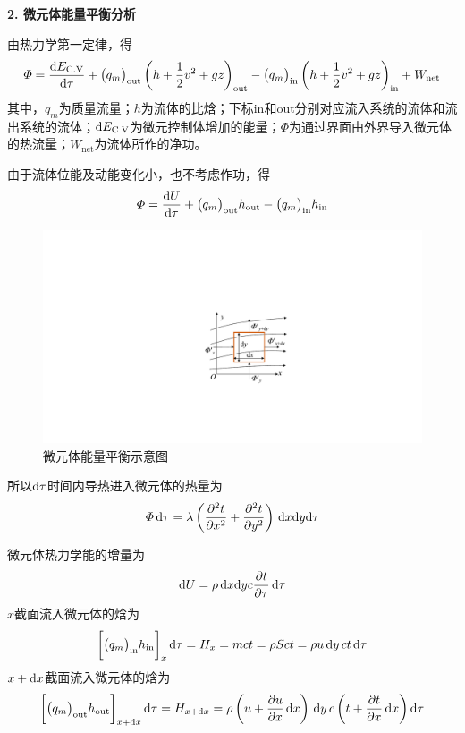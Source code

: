 \noindent \textbf{2. 微元体能量平衡分析}

由热力学第一定律，得
\begin{equation}
	\varPhi = \dfrac{{\rm{d}} E_{\text{C.V}}}{{\rm{d}} \tau} + \big(q_m\big)_{\text{out}} \left(h + \dfrac{1}{2}v^2 + gz\right)_{\text{out}} - \big(q_m\big)_{\text{in}} \left(h + \dfrac{1}{2} v^2 + gz\right)_{\text{in}} + W_{\text{net}}
\end{equation}
其中，$q_m$为质量流量；$h$为流体的比焓；下标in和out分别对应流入系统的流体和流出系统的流体；${\rm{d}} E_{\text{C.V}}$为微元控制体增加的能量；$\varPhi$为通过界面由外界导入微元体的热流量；$W_{\text{net}}$为流体所作的净功。

由于流体位能及动能变化小，也不考虑作功，得
\begin{equation}
	\varPhi = \dfrac{{\rm{d}} U}{{\rm{d}} \tau} + \big(q_m\big)_{\text{out}}h_{\text{out}}-\big(q_m\big)_{\text{in}}h_{\text{in}}
\end{equation}
\begin{figure}[!htb]
	\centering
	\vspace*{-2em}
	\includegraphics[width=0.25\linewidth]{pic/微元体能量平衡.pdf}
	\vspace*{-1em}
	\caption{微元体能量平衡示意图}
	\label{微元体能量平衡}
\end{figure}

所以${\rm{d}} \tau$时间内导热进入微元体的热量为
\begin{equation}
	\varPhi \, {\rm{d}} \tau = \lambda \left(\dfrac{\partial^2 t}{\partial x^2} + \dfrac{\partial^2 t}{\partial y^2}\right) \, {\rm{d}} x {\rm{d}} y {\rm{d}} \tau
\end{equation}

微元体热力学能的增量为
\begin{equation}
	{\rm{d}} U = \rho \, {\rm{d}} x {\rm{d}} y c \dfrac{\partial t}{\partial \tau}\, {\rm{d}} \tau
	\label{能量守恒分析}
\end{equation}
$x$截面流入微元体的焓为
\begin{equation}
	\bigg[\big(q_m\big)_{\text{in}}h_{\text{in}}\bigg]_x \, {\rm{d}} \tau = H_x = mct = \rho S c t = \rho u \, {\rm{d}} y \, ct \, {\rm{d}} \tau
\end{equation}
$x + {\rm{d}} x$截面流入微元体的焓为
\begin{equation}
	\bigg[\big( q_m \big)_{\text{out}} h_{\text{out}}\bigg]_{x+{\rm{d}} x} \, {\rm{d}} \tau = H_{x +{\rm{d}} x} = \rho \left(u+\dfrac{\partial u}{\partial x}\, {\rm{d}} x\right) \, {\rm{d}} y \, c \left(t + \dfrac{\partial t}{\partial x}\, {\rm{d}} x\right) {\rm{d}} \tau
\end{equation}

